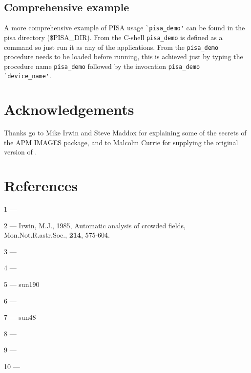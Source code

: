 \subsection{Comprehensive example}
\label{pisa_demo}

A more comprehensive example of PISA usage \verb+`pisa_demo'+ can be
found in the pisa directory (\$PISA\_DIR). From the C-shell
\verb+pisa_demo+ is defined as a command so just run it as any of the
applications. From  the \verb+pisa_demo+ procedure
needs to be loaded before running, this is achieved just by typing the
procedure name \verb+pisa_demo+ followed by the invocation
\verb+pisa_demo `device_name'+.

\section{Acknowledgements}

Thanks go to Mike Irwin and Steve Maddox for explaining some of the
secrets of the APM IMAGES package, and to Malcolm Currie for supplying
the original version of .

\section{References}

 1 --- 

 2 --- Irwin, M.J., 1985, \label{[2]}Automatic analysis of crowded fields,
       Mon.Not.R.astr.Soc., {\bf 214}, 575-604.

 3 --- 

 4 --- 

 5 --- 
       {sun190}{}

 6 --- 

 7 --- 
       {sun48}{}

 8 --- 

 9 --- 

10 --- 

